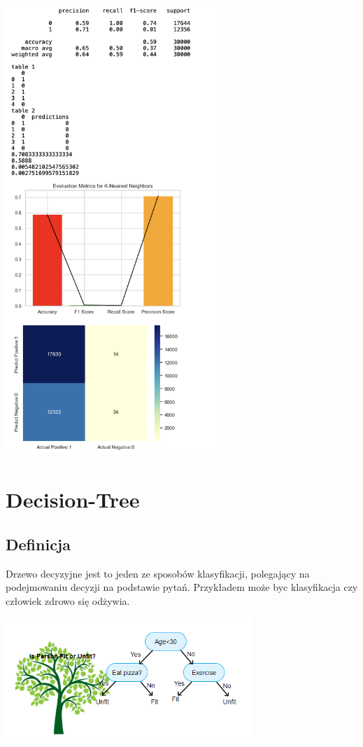 \documentclass{article}
\begin{document}
{\begin{lstlisting}
    \end{lstlisting}
    \begin{center}
    \includegraphics[width=0.6\textwidth]{image10.png}\newline
\end{center}
\newpage

\section{\LARGE{Decision-Tree}}
\subsection{Definicja}
Drzewo decyzyjne jest to jeden ze sposobów klasyfikacji, polegający na podejmowaniu decyzji na podstawie pytań. Przykładem może byc klasyfikacja czy człowiek zdrowo się odżywia.
    \begin{center}
    \includegraphics[width=0.7\textwidth]{is.png}\newline
\end{center}
}
\end{document}
